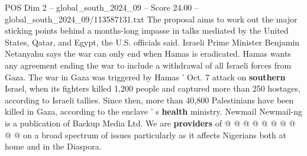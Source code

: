 \begin{textsample}{POS Dim 2 – global\_south\_2024\_09 – Score 24.00 – global\_south\_2024\_09/113587131.txt}
The proposal aims to work out the major sticking points behind a months-long impasse in talks mediated by the United States, Qatar, and Egypt, the U.S. officials said.
Israeli Prime Minister Benjamin Netanyahu says the war can only end when Hamas is eradicated.
Hamas wants any agreement ending the war to include a withdrawal of all Israeli forces from Gaza.
The war in Gaza was triggered by Hamas ' Oct. 7 attack on \textbf{southern} Israel, when its fighters killed 1,200 people and captured more than 250 hostages, according to Israeli tallies.
Since then, more than 40,800 Palestinians have been killed in Gaza, according to the enclave ' s \textbf{health} ministry.
Newmail Newmail-ng is a publication of Backup Media Ltd.
We are \textbf{providers} of @ @ @ @ @ @ @ @ @ @ on a broad spectrum of issues particularly as it affects Nigerians both at home and in the Diaspora.

\end{textsample}
